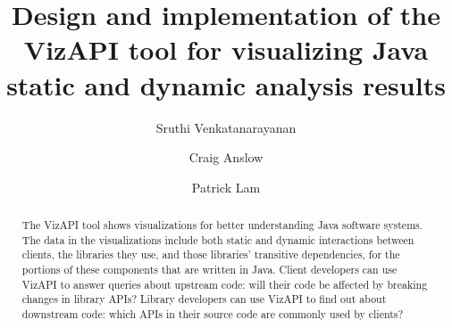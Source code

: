 \documentclass[3p,times]{elsarticle}
\begin{document}
\begin{frontmatter}




  \title{Design and implementation of the VizAPI tool for visualizing Java static and dynamic analysis results}
  

\author[label1]{Sruthi Venkatanarayanan}
\author[label2]{Craig Anslow}
\author[label1]{Patrick Lam}

\address[label1]{University of Waterloo\\200 University Ave W\\Waterloo, ON N2L 3G1\\Canada}
\address[label2]{Victoria University of Wellington\\PO Box 600\\Wellington 6140\\New Zealand}

\begin{abstract}
  The VizAPI tool shows visualizations for better understanding Java software systems. The data in the visualizations include both static and dynamic interactions between clients, the libraries they use, and those libraries' transitive dependencies, for the portions of these components that are written in Java. Client developers can use VizAPI to answer queries about upstream code: will their code be affected by breaking changes in library APIs? Library developers can use VizAPI to find out about downstream code: which APIs in their source code are commonly used by clients?


\end{abstract}
\end{frontmatter}
\end{document}

